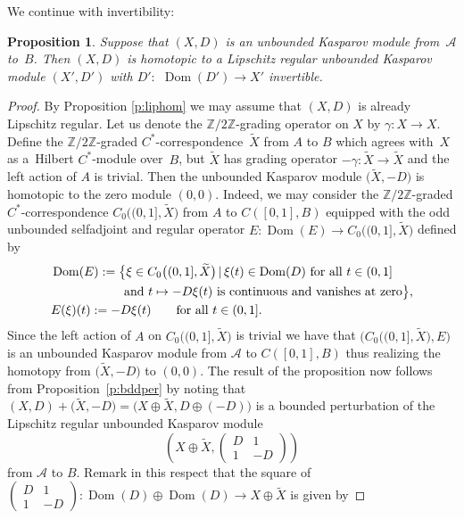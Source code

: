 \documentclass[pdftex]{sigma}
\numberwithin{equation}{section}
\newtheorem{prop}[Theorem]{Proposition}
 { \theoremstyle{definition}
\newtheorem{dfn}[Theorem]{Definition}
\newtheorem{exa}[Theorem]{Example}
\newtheorem{rem}[Theorem]{Remark} }
\newcommand{\op}{\oplus}
\newcommand{\zz}{\mathbb{Z}}
\newcommand{\ga}{\gamma}
\newcommand{\s}[1]{\mathscr{#1}}
\newcommand{\wit}{\widetilde}
\begin{document}
We continue with invertibility:

\begin{prop}\label{p:lipinv}
Suppose that $(X,D)$ is an unbounded Kasparov module from~$\s A$ to~$B$. Then $(X,D)$ is homotopic to a Lipschitz regular unbounded Kasparov module $(X', D')$ with $D'\colon$ $\operatorname{Dom}(D') \to X'$ invertible.
\end{prop}
\begin{proof}By Proposition \ref{p:liphom} we may assume that $(X,D)$ is already Lipschitz regular. Let us denote the $\zz/2\zz$-grading operator on $X$ by $\ga\colon X \to X$. Define the $\zz/2\zz$-graded $C^*$-corresponden\-ce~$\wit{X}$ from $A$ to $B$ which agrees with~$X$ as a~Hilbert $C^*$-module over~$B$, but $\wit{X}$ has grading operator $-\ga\colon \wit{X} \to \wit{X}$ and the left action of $A$ is trivial. Then the unbounded Kasparov module $\big(\wit{X},-D\big)$ is homotopic to the zero module $(0,0)$. Indeed, we may consider the $\zz/2\zz$-graded $C^*$-correspondence $C_0\big( (0,1],\wit{X}\big)$ from $A$ to $C( [0,1],B)$ equipped with the odd unbounded selfadjoint and regular operator $E\colon \operatorname{Dom}(E) \to C_0\big( (0,1],\wit{X}\big)$ defined by
\begin{gather*}
\begin{split}
& \operatorname{Dom}(E) := \big\{ \xi \in C_0\big( (0,1],\wit{X}\big) \,|\, \xi(t) \in \operatorname{Dom}(D) \ \text{for all} \ t \in (0,1] \\
& \hphantom{\operatorname{Dom}(E) := \big\{}{} \text{and} \ t \mapsto - D \xi(t) \ \text{is continuous and vanishes at zero} \big\},\\
& E(\xi)(t) := - D \xi(t) \qquad \text{for all } t \in (0,1] .
\end{split}
\end{gather*}
Since the left action of $A$ on $C_0\big( (0,1],\wit{X}\big)$ is trivial we have that $\big( C_0\big( (0,1],\wit{X}\big), E\big)$ is an unbounded Kasparov module from $\s A$ to $C([0,1],B)$ thus realizing the homotopy from $\big(\wit{X},-D\big)$ to $(0,0)$. The result of the proposition now follows from Proposition~\ref{p:bddper} by noting that $(X,D) + \big(\wit{X}, -D\big) = \big(X \op \wit{X}, D \op (-D)\big)$ is a bounded perturbation of the Lipschitz regular unbounded Kasparov module
\[
\left(X \op \wit{X}, \left(\begin{matrix} D & 1 \\ 1 & - D\end{matrix}\right)\right)
\]
from $\s A$ to $B$. Remark in this respect that the square of $\left(\begin{smallmatrix}D & 1 \\ 1 & - D\end{smallmatrix}\right)\colon \operatorname{Dom}(D) \op \operatorname{Dom}(D) \to X \op \wit{X}$ is given by

\end{proof}
\end{document}

